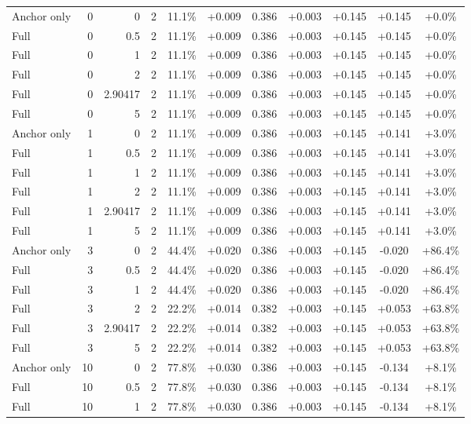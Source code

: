 \begin{table}[htbp]
\begin{tabular}{lrrrccccccc}
Anchor only & 0 & 0 & 2 & 11.1\% & +0.009 & 0.386 & +0.003 & +0.145 & +0.145 & +0.0\% \\
Full & 0 & 0.5 & 2 & 11.1\% & +0.009 & 0.386 & +0.003 & +0.145 & +0.145 & +0.0\% \\
Full & 0 & 1 & 2 & 11.1\% & +0.009 & 0.386 & +0.003 & +0.145 & +0.145 & +0.0\% \\
Full & 0 & 2 & 2 & 11.1\% & +0.009 & 0.386 & +0.003 & +0.145 & +0.145 & +0.0\% \\
Full & 0 & 2.90417 & 2 & 11.1\% & +0.009 & 0.386 & +0.003 & +0.145 & +0.145 & +0.0\% \\
Full & 0 & 5 & 2 & 11.1\% & +0.009 & 0.386 & +0.003 & +0.145 & +0.145 & +0.0\% \\
Anchor only & 1 & 0 & 2 & 11.1\% & +0.009 & 0.386 & +0.003 & +0.145 & +0.141 & +3.0\% \\
Full & 1 & 0.5 & 2 & 11.1\% & +0.009 & 0.386 & +0.003 & +0.145 & +0.141 & +3.0\% \\
Full & 1 & 1 & 2 & 11.1\% & +0.009 & 0.386 & +0.003 & +0.145 & +0.141 & +3.0\% \\
Full & 1 & 2 & 2 & 11.1\% & +0.009 & 0.386 & +0.003 & +0.145 & +0.141 & +3.0\% \\
Full & 1 & 2.90417 & 2 & 11.1\% & +0.009 & 0.386 & +0.003 & +0.145 & +0.141 & +3.0\% \\
Full & 1 & 5 & 2 & 11.1\% & +0.009 & 0.386 & +0.003 & +0.145 & +0.141 & +3.0\% \\
Anchor only & 3 & 0 & 2 & 44.4\% & +0.020 & 0.386 & +0.003 & +0.145 & -0.020 & +86.4\% \\
Full & 3 & 0.5 & 2 & 44.4\% & +0.020 & 0.386 & +0.003 & +0.145 & -0.020 & +86.4\% \\
Full & 3 & 1 & 2 & 44.4\% & +0.020 & 0.386 & +0.003 & +0.145 & -0.020 & +86.4\% \\
Full & 3 & 2 & 2 & 22.2\% & +0.014 & 0.382 & +0.003 & +0.145 & +0.053 & +63.8\% \\
Full & 3 & 2.90417 & 2 & 22.2\% & +0.014 & 0.382 & +0.003 & +0.145 & +0.053 & +63.8\% \\
Full & 3 & 5 & 2 & 22.2\% & +0.014 & 0.382 & +0.003 & +0.145 & +0.053 & +63.8\% \\
Anchor only & 10 & 0 & 2 & 77.8\% & +0.030 & 0.386 & +0.003 & +0.145 & -0.134 & +8.1\% \\
Full & 10 & 0.5 & 2 & 77.8\% & +0.030 & 0.386 & +0.003 & +0.145 & -0.134 & +8.1\% \\
Full & 10 & 1 & 2 & 77.8\% & +0.030 & 0.386 & +0.003 & +0.145 & -0.134 & +8.1\% \\

\end{tabular}
\end{table}
